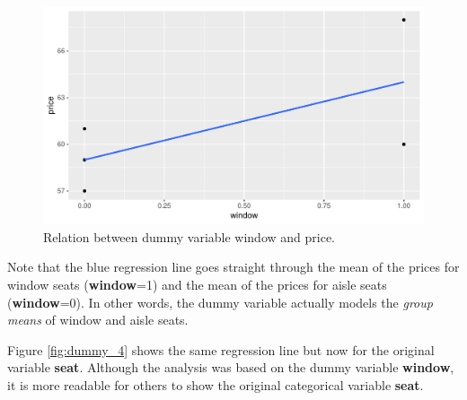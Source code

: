 \documentclass[]{report}\usepackage[]{graphicx}\usepackage[]{color}
\makeatletter
\def\maxwidth{ %
  \ifdim\Gin@nat@width>\linewidth
    \linewidth
  \else
    \Gin@nat@width
  \fi
}
\newenvironment{knitrout}{}{} %
\makeatother
\begin{document}
\begin{knitrout}
\color{fgcolor}\begin{figure}

{\centering \includegraphics[width=\maxwidth]{figure/dummy_3-1} 

}

\caption[Relation between dummy variable window and price]{Relation between dummy variable window and price.}\label{fig:dummy_3}
\end{figure}


\end{knitrout}


Note that the blue regression line goes straight through the mean of the prices for window seats (\textbf{window}=1) and the mean of the prices for aisle seats (\textbf{window}=0). In other words, the dummy variable actually models the \textit{group means} of window and aisle seats.

Figure \ref{fig:dummy_4} shows the same regression line but now for the original variable \textbf{seat}. Although the analysis was based on the dummy variable \textbf{window}, it is more readable for others to show the original categorical variable \textbf{seat}.
\end{document}
